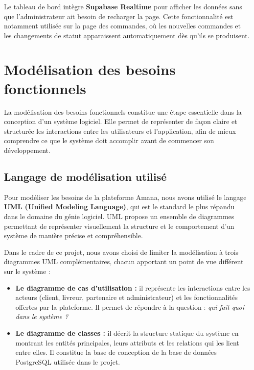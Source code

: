 \documentclass[12pt,fleqn,a4paper]{report}
\begin{document}
\begin{justify}
Le tableau de bord intègre \textbf{Supabase Realtime} pour
afficher les données sans que l'administrateur ait besoin
de recharger la page. Cette fonctionnalité est notamment
utilisée sur la page des commandes, où les nouvelles
commandes et les changements de statut apparaissent
automatiquement dès qu'ils se produisent.

\section{Modélisation des besoins fonctionnels}

La modélisation des besoins fonctionnels constitue une étape
essentielle dans la conception d'un système logiciel. Elle permet
de représenter de façon claire et structurée les interactions entre
les utilisateurs et l'application, afin de mieux comprendre ce que
le système doit accomplir avant de commencer son développement.

\subsection{Langage de modélisation utilisé}

Pour modéliser les besoins de la plateforme Amana, nous avons
utilisé le langage \textbf{UML (Unified Modeling Language)},
qui est le standard le plus répandu dans le domaine du génie
logiciel. UML propose un ensemble de diagrammes permettant de
représenter visuellement la structure et le comportement d'un
système de manière précise et compréhensible.

Dans le cadre de ce projet, nous avons choisi de limiter
la modélisation à trois diagrammes UML complémentaires,
chacun apportant un point de vue différent sur le système :

\begin{itemize}
    \item \textbf{Le diagramme de cas d'utilisation :}
    il représente les interactions entre les acteurs
    (client, livreur, partenaire et administrateur)
    et les fonctionnalités offertes par la plateforme.
    Il permet de répondre à la question :
    \textit{qui fait quoi dans le système ?}

    \item \textbf{Le diagramme de classes :}
    il décrit la structure statique du système en
    montrant les entités principales, leurs attributs
    et les relations qui les lient entre elles.
    Il constitue la base de conception de la base
    de données PostgreSQL utilisée dans le projet.


\end{itemize}
\end{justify}
\end{document}

